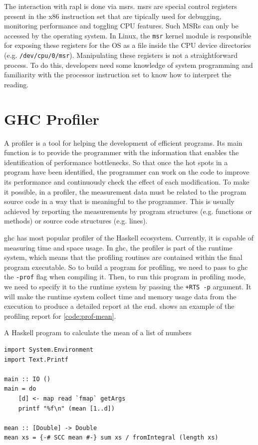 The interaction with \acs{rapl} is done via \acp{msr}. \acp{msr} are special control registers present in the x86 instruction set that are tipically used for debugging, monitoring performance and toggling CPU features. Such MSRs can only be accessed by the operating system. In Linux, the \texttt{msr} kernel module is responsible for exposing these registers for the OS as a file inside the CPU device directories (e.g. \texttt{/dev/cpu/0/msr}). Manipulating these registers is not a straightforward process. To do this, developers need some knowledge of system programming and familiarity with the processor instruction set to know how to interpret the reading.


\section{GHC Profiler}\label{sec:profiler}
A profiler is a tool for helping the development of efficient programs. Its main function is to provide the programmer with the information that enables the identification of performance bottlenecks. So that once the hot spots in a program have been identified, the programmer can work on the code to improve its performance and continuously check the effect of each modification. To make it possible, in a profiler, the measurement data must be related to the program source code in a way that is meaningful to the programmer. This is usually achieved by reporting the measurements by program structures (e.g. functions or methods) or source code structures (e.g. lines).

\ac{ghc} has most popular profiler of the Haskell ecosystem. Currently, it is capable of measuring time and space usage. In \ac{ghc}, the profiler is part of the runtime system, which means that the profiling routines are contained within the final program executable. So to build a program for profiling, we need to pass to \ac{ghc} the \texttt{-prof} flag when compiling it. Then, to run this program in profiling mode, we need to specify it to the runtime system by passing the \texttt{+RTS -p} argument. It will make the runtime system collect time and memory usage data from the execution to produce a detailed report at the end.  shows an example of the profiling report for \autoref{code:prof-mean}.

\begin{listing}
  \caption{A Haskell program to calculate the mean of a list of numbers}
  \begin{verbatim}
import System.Environment
import Text.Printf

main :: IO ()
main = do
    [d] <- map read `fmap` getArgs
    printf "%f\n" (mean [1..d])

mean :: [Double] -> Double
mean xs = {-# SCC mean #-} sum xs / fromIntegral (length xs)
  \end{verbatim}
  \label{code:prof-mean}
\end{listing}

